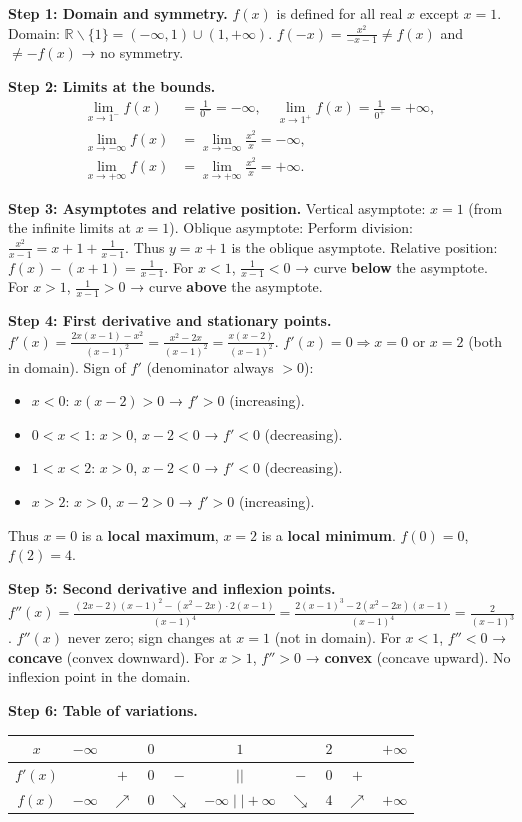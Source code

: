 \documentclass[11pt]{article}
\def\setminus{\mathbin{\backslash}}\let\smallsetminus\setminus
\begin{document}
\begin{exoresolu}[Complete sketch of $f(x)=\frac{x^2}{x-1}$]
\textbf{Step 1: Domain and symmetry.}
$f(x)$ is defined for all real $x$ except $x=1$. Domain: $\mathbb{R}\setminus\{1\}=(-\infty,1)\cup(1,+\infty)$.
$f(-x)=\frac{x^2}{-x-1}\neq f(x)$ and $\neq -f(x)$ → no symmetry.

\textbf{Step 2: Limits at the bounds.}
\begin{align*}
\lim_{x\to 1^-}f(x) &= \frac{1}{0^-} = -\infty, \quad
\lim_{x\to 1^+}f(x) = \frac{1}{0^+} = +\infty,\\
\lim_{x\to -\infty}f(x) &= \lim_{x\to -\infty}\frac{x^2}{x} = -\infty,\\
\lim_{x\to +\infty}f(x) &= \lim_{x\to +\infty}\frac{x^2}{x} = +\infty.
\end{align*}

\textbf{Step 3: Asymptotes and relative position.}
Vertical asymptote: $x=1$ (from the infinite limits at $x=1$).
Oblique asymptote: Perform division: $\frac{x^2}{x-1}=x+1+\frac{1}{x-1}$.
Thus $y=x+1$ is the oblique asymptote.
Relative position: $f(x)-(x+1)=\frac{1}{x-1}$.
For $x<1$, $\frac{1}{x-1}<0$ → curve \textbf{below} the asymptote.
For $x>1$, $\frac{1}{x-1}>0$ → curve \textbf{above} the asymptote.

\textbf{Step 4: First derivative and stationary points.}
$f'(x)=\frac{2x(x-1)-x^2}{(x-1)^2}=\frac{x^2-2x}{(x-1)^2}=\frac{x(x-2)}{(x-1)^2}$.
$f'(x)=0 \Rightarrow x=0$ or $x=2$ (both in domain).
Sign of $f'$ (denominator always $>0$):
\begin{itemize}
\item $x<0$: $x(x-2)>0$ → $f'>0$ (increasing).
\item $0<x<1$: $x>0$, $x-2<0$ → $f'<0$ (decreasing).
\item $1<x<2$: $x>0$, $x-2<0$ → $f'<0$ (decreasing).
\item $x>2$: $x>0$, $x-2>0$ → $f'>0$ (increasing).
\end{itemize}
Thus $x=0$ is a \textbf{local maximum}, $x=2$ is a \textbf{local minimum}.
$f(0)=0$, $f(2)=4$.

\textbf{Step 5: Second derivative and inflexion points.}
$f''(x)=\frac{(2x-2)(x-1)^2 - (x^2-2x)\cdot2(x-1)}{(x-1)^4}
= \frac{2(x-1)^3 - 2(x^2-2x)(x-1)}{(x-1)^4}
= \frac{2}{(x-1)^3}$.
$f''(x)$ never zero; sign changes at $x=1$ (not in domain).
For $x<1$, $f''<0$ → \textbf{concave} (convex downward).
For $x>1$, $f''>0$ → \textbf{convex} (concave upward).
No inflexion point in the domain.

\textbf{Step 6: Table of variations.}
\begin{center}
\begin{tabular}{|c|ccccccccc|}
\hline
$x$ & $-\infty$ & & $0$ & & $1$ & & $2$ & & $+\infty$ \\
\hline
$f'(x)$ & & $+$ & $0$ & $-$ & $||$ & $-$ & $0$ & $+$ & \\
\hline
$f(x)$ & $-\infty$ & $\nearrow$ & $0$ & $\searrow$ & $-\infty\mid\mid+\infty$ & $\searrow$ & $4$ & $\nearrow$ & $+\infty$ \\
\hline
\end{tabular}
\end{center}


\end{exoresolu}
\end{document}
